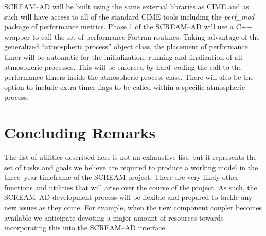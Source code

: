 \documentclass[10pt]{article}
\begin{document}
SCREAM--AD will be built using the same external libraries as CIME and as such will have access to all of the standard CIME tools including the \emph{perf\_mod} package of performance metrics.  Phase 1 of the SCREAM--AD will use a C++ wrapper to call the set of performance Fortran routines.  Taking advantage of the generalized ``atmospheric process'' object class, the placement of performance timer will be automatic for the initialization, running and finalization of all atmospheric processes.  This will be enforced by hard--coding the call to the performance timers inside the atmospheric process class.  There will also be the option to include extra timer flags to be called within a specific atmospheric process.

\section{Concluding Remarks}
\label{sec:concluding}

The list of utilities described here is not an exhaustive list, but it represents the set of tasks and goals we believe are required to produce a working model in the three--year timeframe of the SCREAM project.  There are very likely other functions and utilities that will arise over the course of the project.  As such, the SCREAM--AD development process will be flexible and prepared to tackle any new issues as they come.  For example, when the new component coupler becomes available we anticipate devoting a major amount of resources towards incorporating this into the SCREAM--AD interface.

{}

\end{document}

